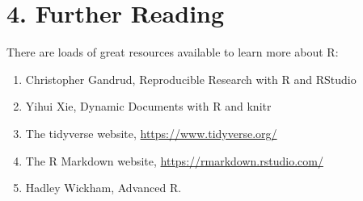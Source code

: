\documentclass[
]{article}
\providecommand{\tightlist}{%
  \setlength{\itemsep}{0pt}\setlength{\parskip}{0pt}}
\begin{document}
\hypertarget{further-reading}{%
\section{4. Further Reading}\label{further-reading}}

There are loads of great resources available to learn more about R:

\begin{enumerate}
\def\labelenumi{\arabic{enumi}.}
\tightlist
\item
  Christopher Gandrud, Reproducible Research with R and RStudio
\item
  Yihui Xie, Dynamic Documents with R and knitr
\item
  The tidyverse website, \url{https://www.tidyverse.org/}
\item
  The R Markdown website, \url{https://rmarkdown.rstudio.com/}
\item
  Hadley Wickham, Advanced R.
\end{enumerate}
\end{document}
